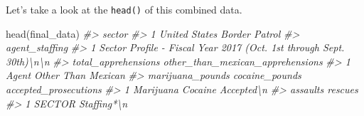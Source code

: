 \documentclass[
]{krantz}
\makeatletter
\newenvironment{Shaded}{\begin{snugshade}}{\end{snugshade}}
\newcommand{\CommentTok}[1]{\textcolor[rgb]{0.37,0.37,0.37}{\textit{#1}}}
\newcommand{\FunctionTok}[1]{\textcolor[rgb]{0,0,0}{#1}}
\newcommand{\NormalTok}[1]{#1}
\newenvironment{kframe}{%
\medskip{}
\setlength{\fboxsep}{.8em}
 \def\at@end@of@kframe{}%
 \ifinner\ifhmode%
  \def\at@end@of@kframe{\end{minipage}}%
  \begin{minipage}{\columnwidth}%
 \fi\fi%
 \def\FrameCommand##1{\hskip\@totalleftmargin \hskip-\fboxsep
 \colorbox{shadecolor}{##1}\hskip-\fboxsep
     \hskip-\linewidth \hskip-\@totalleftmargin \hskip\columnwidth}%
 \MakeFramed {\advance\hsize-\width
   \@totalleftmargin\z@ \linewidth\hsize
   \@setminipage}}%
 {\par\unskip\endMakeFramed%
 \at@end@of@kframe}
\renewenvironment{Shaded}{\begin{kframe}}{\end{kframe}}
\makeatother
\begin{document}
Let's take a look at the \texttt{head()} of this combined data.

\begin{Shaded}
\begin{Highlighting}[]
\FunctionTok{head}\NormalTok{(final\_data)}
\CommentTok{\#\textgreater{}                        sector}
\CommentTok{\#\textgreater{} 1 United States Border Patrol}
\CommentTok{\#\textgreater{}                                                        agent\_staffing}
\CommentTok{\#\textgreater{} 1 Sector Profile {-} Fiscal Year 2017 (Oct. 1st through Sept. 30th)\textbackslash{}n\textbackslash{}n}
\CommentTok{\#\textgreater{}   total\_apprehensions other\_than\_mexican\_apprehensions}
\CommentTok{\#\textgreater{} 1               Agent               Other Than Mexican}
\CommentTok{\#\textgreater{}   marijuana\_pounds cocaine\_pounds accepted\_prosecutions}
\CommentTok{\#\textgreater{} 1        Marijuana        Cocaine            Accepted\textbackslash{}n}
\CommentTok{\#\textgreater{}   assaults     rescues}
\CommentTok{\#\textgreater{} 1   SECTOR Staffing*\textbackslash{}n}

\end{Highlighting}
\end{Shaded}
\end{document}
